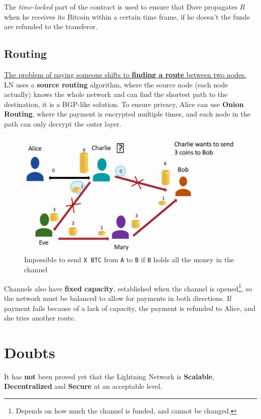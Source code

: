 The \textit{time-locked} part of the contract is used to ensure that Dave propagates $R$ when he receives its Bitcoin within a certain time frame, if he doesn't the funds are refunded to the transferor.

\subsection{Routing}
\label{sec:routing}
\ul{The problem of paying someone shifts to \textbf{finding a route} between two nodes.}\\
LN uses a \textbf{source routing} algorithm, where the source node (each node actually) knows the whole network and can find the shortest path to the destination, it is a BGP-like solution.
To ensure privacy, Alice can use \textbf{Onion Routing}, where the payment is encrypted multiple times, and each node in the path can only decrypt the outer layer.

\begin{paracol}{2}
   \begin{figure}[htbp]
      \centering
      \includegraphics{images/lightning_capacity.png}
      \caption{Impossible to send \texttt{X BTC} from \texttt{A} to \texttt{B} if \texttt{B} holds all the money in the channel}
      \label{fig:lightning_capacity}
   \end{figure}
   \switchcolumn
   Channels also have \textbf{fixed capacity}, established when the channel is opened\footnote{Depends on how much the channel is funded, and cannot be changed.}, so the network must be balanced to allow for payments in both directions. 
   If payment fails because of a lack of capacity, the payment is refunded to Alice, and she tries another route.
\end{paracol}

\section{Doubts}
It has \textbf{not} been proved yet that the Lightning Network is \textbf{Scalable}, \textbf{Decentralized} and \textbf{Secure} at an acceptable level.

